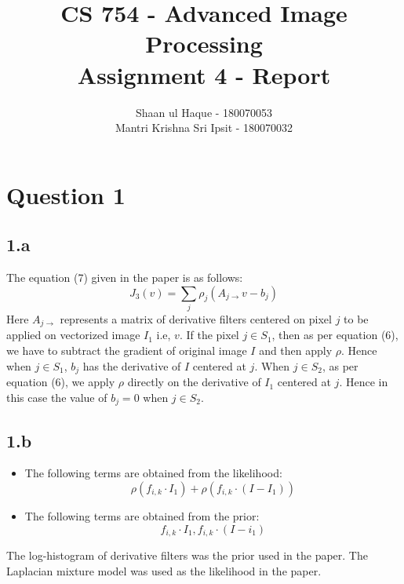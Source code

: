 \documentclass[12pt]{article}
\title{CS 754 - Advanced Image Processing\\Assignment 4 - Report}
\author{Shaan ul Haque - 180070053\\Mantri Krishna Sri Ipsit - 180070032}
\begin{document}
	
	\maketitle
\section*{Question 1}
\subsection*{1.a}
The equation (7) given in the paper is as follows:
$$J_3(v) = \sum \limits_j \rho_j (A_{j\rightarrow}v - b_j)$$
Here $A_{j\rightarrow}$ represents a matrix of derivative filters centered on pixel $j$ to be applied on vectorized image $I_1$ i.e, $v$. If the pixel $j \in S_1$, then as per equation (6), we have to subtract the gradient of original image $I$ and then apply $\rho$. Hence when $j \in S_1$, $b_j$  has the derivative of $I$ centered at $j$. \newline
When $j \in S_2$, as per equation (6), we apply $\rho$ directly on the derivative of $I_1$ centered at $j$. Hence in this case the value of $b_j=0$ when $j \in S_2$.
\subsection*{1.b}
\begin{itemize}
	\item The following terms are obtained from the likelihood:
	$$\rho(f_{i,k}\cdot I_1) + \rho(f_{i,k}\cdot (I-I_1))$$
	\item The following terms are obtained from the prior:
	$$f_{i,k} \cdot I_1, f_{i,k}\cdot (I-i_1)$$ 
\end{itemize}
The log-histogram of derivative filters was the prior used in the paper. The Laplacian mixture model was used as the likelihood in the paper.
\end{document}
